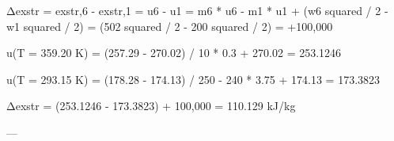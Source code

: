 Δexstr = exstr,6 - exstr,1  
= u6 - u1  
= m6 * u6 - m1 * u1 + (w6 squared / 2 - w1 squared / 2)  
= (502 squared / 2 - 200 squared / 2)  
= +100,000  

u(T = 359.20 K) = (257.29 - 270.02) / 10 * 0.3 + 270.02 = 253.1246  

u(T = 293.15 K) = (178.28 - 174.13) / 250 - 240 * 3.75 + 174.13 = 173.3823  

Δexstr = (253.1246 - 173.3823) + 100,000  
= 110.129 kJ/kg  

---